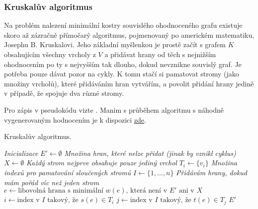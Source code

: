 \subsubsection{Kruskalův algoritmus}
\label{sssec:kruskaluv-algoritmus}

Na problém nalezení minimální kostry souvislého ohodnoceného grafu existuje
skoro až zázračně přímočarý algoritmus, pojmenovaný po americkém matematiku,
Josephu B. Kruskalovi. Jeho základní myšlenkou je prostě začít s grafem $K$
obsahujícím všechny vrcholy z $V$ a přidávat hrany od těch s nejnižším
ohodnocením po ty s nejvyšším tak dlouho, dokud nevznikne souvislý graf. Je
potřeba pouze dávat pozor na cykly. K tomu stačí si pamatovat stromy (jako
množiny vrcholů), které přidáváním hran vytvářím, a povolit přidání hrany
jedině v případě, že spojuje dva různé stromy.

Pro zápis v pseudokódu vizte . Manim s průběhem
algoritmu s náhodně vygenerovaným hodnocením je k dispozici
\href{https://raw.githubusercontent.com/Tesser3kt/GEVO/main/Seminar/animations/media/videos/graphs/2160p60/SpanningTreeExample.mp4}{zde}.

\pagebreak

\begin{algorithm}
 \caption{Kruskalův algoritmus.}
 \label{alg:kruskal}


 \BlankLine
 \emph{Inicializace}\;
 $E' \leftarrow \emptyset$\;
 \emph{Množina hran, které nelze přidat (jinak by vznikl cyklus)}\;
 $X \leftarrow \emptyset$\;
  {
  \emph{Každý strom nejprve obsahuje pouze jediný vrchol}\;
  $T_i \leftarrow \{v_i\}$\;
 }
 \emph{Množina indexů pro pamatování sloučených stromů}\;
 $I \leftarrow \{1,\ldots,n\}$\;
 \BlankLine
 \emph{Přidávám hrany, dokud mám pořád víc než jeden strom}\;
  {
  $e \leftarrow \text{libovolná hrana s minimální } w(e) \text{, která není v }
  E' \text{ ani v } X$\;
  $i \leftarrow \text{index v } I \text{ takový, že } s(e) \in T_i$\;
  $j \leftarrow \text{index v } I \text{ takový, že } t(e) \in T_j$\;
  \BlankLine
 }
 \KwReturn $E'$\;
\end{algorithm}

